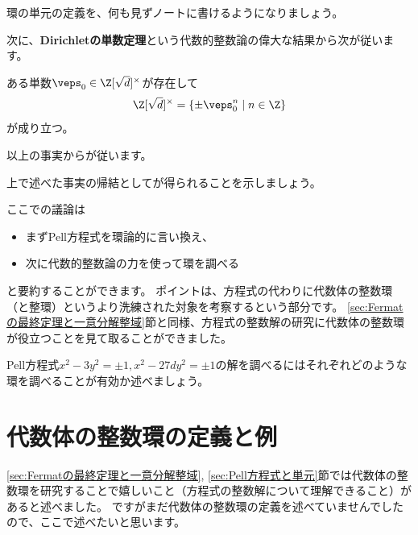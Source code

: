 \documentclass[11pt,b5paper,oneside,titlepage,lualatex]{ltjsreport}
\begin{document}
\begin{exercise}{}{}
	環の単元の定義を、何も見ずノートに書けるようになりましょう。
\end{exercise}

次に、\textbf{Dirichletの単数定理}という代数的整数論の偉大な結果から次が従います。

\begin{theorem}{}{}
	ある単数$ \veps_0 \in \Z[\sqrt{d}]^\times $が存在して
	\[
	\Z[\sqrt{d}]^\times = \{ \pm \veps_0^n \mid n \in \Z \}
	\]
	が成り立つ。
\end{theorem}

以上の事実からが従います。

\begin{exercise}{}{}
	上で述べた事実の帰結としてが得られることを示しましょう。
\end{exercise}

ここでの議論は
\begin{itemize}
	\item まずPell方程式を環論的に言い換え、
	\item 次に代数的整数論の力を使って環を調べる
\end{itemize}
と要約することができます。
ポイントは、方程式の代わりに代数体の整数環（と整環）というより洗練された対象を考察するという部分です。
\ref{sec:Fermatの最終定理と一意分解整域}節と同様、方程式の整数解の研究に代数体の整数環が役立つことを見て取ることができました。

\begin{exercise}{}{}
	Pell方程式$ x^2 - 3y^2 = \pm 1, x^2 - 27dy^2 = \pm 1 $の解を調べるにはそれぞれどのような環を調べることが有効か述べましょう。
\end{exercise}


\section{代数体の整数環の定義と例} \label{sec:代数体の整数環の定義と例}


\ref{sec:Fermatの最終定理と一意分解整域}, \ref{sec:Pell方程式と単元}節では代数体の整数環を研究することで嬉しいこと（方程式の整数解について理解できること）があると述べました。
ですがまだ代数体の整数環の定義を述べていませんでしたので、ここで述べたいと思います。
\end{document}
